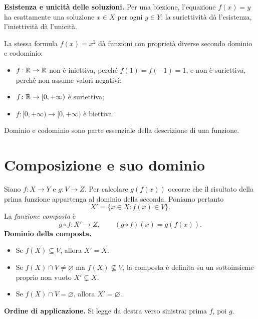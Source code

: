 \textbf{Esistenza e unicità delle soluzioni.} Per una biezione, l'equazione $f(x)=y$ ha esattamente una soluzione $x\in X$ per ogni $y\in Y$: la suriettività dà l'esistenza, l'iniettività dà l'unicità.

\begin{esempio}
La stessa formula $f(x)=x^2$ dà funzioni con proprietà diverse secondo dominio e codominio:
\begin{itemize}
  \item $f\colon\mathbb{R}\to\mathbb{R}$ non è iniettiva, perché $f(1)=f(-1)=1$, e non è suriettiva, perché non assume valori negativi;
  \item $f\colon\mathbb{R}\to[0,+\infty)$ è suriettiva;
  \item $f\colon[0,+\infty)\to[0,+\infty)$ è biettiva.
\end{itemize}
Dominio e codominio sono parte essenziale della descrizione di una funzione.
\end{esempio}

\section{Composizione e suo dominio}

Siano $f\colon X\to Y$ e $g\colon V\to Z$. Per calcolare $g(f(x))$ occorre che il risultato della prima funzione appartenga al dominio della seconda. Poniamo pertanto
\[
X'=\{x\in X:f(x)\in V\}.
\]
La \emph{funzione composta} è
\[
g\circ f\colon X'\longrightarrow Z,\qquad
(g\circ f)(x)=g(f(x)).
\]
\textbf{Dominio della composta.}
\begin{itemize}
  \item Se $f(X)\subseteq V$, allora $X'=X$.
  \item Se $f(X)\cap V\ne\varnothing$ ma $f(X)\nsubseteq V$, la composta è definita su un sottoinsieme proprio non vuoto $X'\subsetneq X$.
  \item Se $f(X)\cap V=\varnothing$, allora $X'=\varnothing$.
\end{itemize}
\textbf{Ordine di applicazione.} Si legge da destra verso sinistra: prima $f$, poi $g$.

\begin{schema}
\end{schema}

